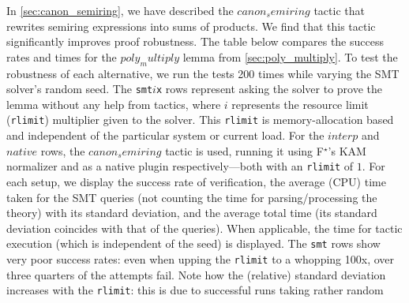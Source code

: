 \documentclass[runningheads]{llncs}
\newcommand\fstar{F$^\star$\xspace}
\begin{document}
In \autoref{sec:canon_semiring}, we have described the
\ls$canon_semiring$ tactic that rewrites semiring expressions into sums
of products.
%
%
%
%
%
%
We find that this tactic significantly improves proof robustness.
%
The table below compares the success rates and times for the
\ls$poly_multiply$ lemma from \autoref{sec:poly_multiply}.
%
To test the robustness of each alternative, we run the tests 200 times
while varying the SMT solver's random seed.
%
The \texttt{smt$i$x} rows represent asking the solver to prove the lemma
without any help from tactics, where $i$ represents the resource limit
(\texttt{rlimit}) multiplier given to the solver.
%
This \texttt{rlimit} is memory-allocation based and independent of the
particular system or current load.
%
For the \ls$interp$ and \ls$native$ rows, the
\ls$canon_semiring$ tactic is used, running it using \fstar's KAM normalizer and
as a native plugin respectively---both with an \texttt{rlimit}
of $1$.
%
For each setup, we display the success rate of verification, the average
(CPU) time taken for the SMT queries (not counting the time for parsing/processing
the theory)
with its standard deviation, and
the average total time (its standard deviation coincides with that of
the queries).
%
When applicable, the time for tactic execution (which is independent of
the seed) is displayed.
%
The \texttt{smt} rows show very poor success rates: even when upping the
\texttt{rlimit} to a whopping 100x, over three quarters of the attempts
fail.
%
\canonfig
%
Note how the (relative) standard deviation increases with the
\texttt{rlimit}: this is due to successful runs taking rather random
\end{document}
